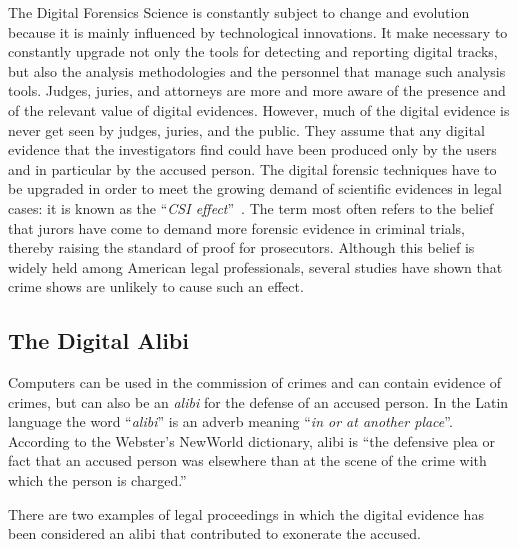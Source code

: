 \documentclass[runningheads,english]{llncs}
\begin{document}
The Digital Forensics Science is constantly subject to change and evolution
because it is mainly influenced by technological innovations. It make necessary to
constantly upgrade not only the tools for detecting and reporting digital
tracks, but also the analysis methodologies and the personnel that manage such 
analysis tools.
Judges, juries, and attorneys are more and more aware of the presence and of the
relevant value of digital evidences. However, much of the digital evidence is never 
get seen by judges, juries, and the public. They assume that any digital evidence
that the investigators find could have been produced only by the users and in
particular by the accused person. 
The digital forensic techniques have to be upgraded in order to meet the growing
demand of scientific evidences in legal cases: it is known as the ``\emph{CSI
effect}''~\cite{csi}. The term most often refers to the belief that jurors have
come to demand more forensic evidence in criminal trials, thereby raising the
standard of proof for prosecutors. Although this belief is widely held among
American legal professionals, several studies have shown that crime shows are
unlikely to cause such an effect.

\subsection{The Digital Alibi}
\label{sub:digital_alibi}

Computers can be used in the commission of crimes and can contain evidence of
crimes, but can also be an \emph{alibi} for the defense of an accused person.
In the Latin language the word ``\emph{alibi}'' is an adverb meaning ``\emph{in or at another
place}''. According to the Webster's NewWorld dictionary, alibi is
``the defensive plea or fact that an accused person was elsewhere than at the
scene of the crime with which the person is charged.''



There are two examples of legal proceedings in which the digital evidence has
been considered an alibi that contributed to exonerate the accused.
\end{document}

